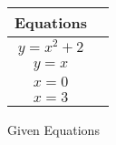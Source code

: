 \begin{tabular}[12pt]{ |c| c|}
    \hline
    \textbf{Equations}\\ 
    \hline
     $y=x^2+2$ \\
    \hline 
     $y=x$\\
    \hline
    $x=0$\\
     \hline 
     $x=3$\\
     \hline
    \end{tabular}
    \caption{Given Equations}